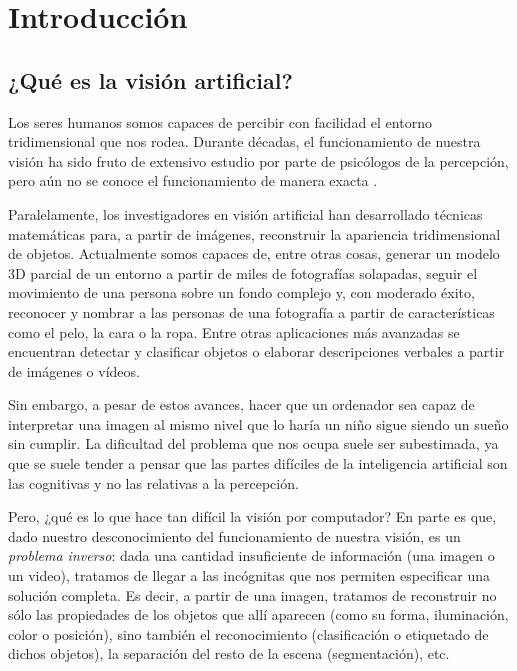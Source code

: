 \section{Introducción}
\subsection{¿Qué es la visión artificial?}

Los seres humanos somos capaces de percibir con facilidad el entorno tridimensional que nos rodea. Durante décadas, el funcionamiento de nuestra visión ha sido fruto de extensivo estudio por parte de psicólogos de la percepción, pero aún no se conoce el funcionamiento de manera exacta  \cite{book:szeliski}.

Paralelamente, los investigadores en visión artificial han desarrollado técnicas matemáticas para, a partir de imágenes, reconstruir la apariencia tridimensional de objetos. Actualmente somos capaces de, entre otras cosas, generar un modelo 3D parcial de un entorno a partir de miles de fotografías solapadas, seguir el movimiento de una persona sobre un fondo complejo y, con moderado éxito, reconocer y nombrar a las personas de una fotografía a partir de características como el pelo, la cara o la ropa. Entre otras aplicaciones más avanzadas se encuentran detectar y clasificar objetos o elaborar descripciones verbales a partir de imágenes o vídeos.

Sin embargo, a pesar de estos avances, hacer que un ordenador sea capaz de interpretar una imagen al mismo nivel que lo haría un niño sigue siendo un sueño sin cumplir. La dificultad del problema que nos ocupa suele ser subestimada, ya que se suele tender a pensar que las partes difíciles de la inteligencia artificial son las cognitivas y no las relativas a la percepción.

Pero, ¿qué es lo que hace tan difícil la visión por computador? En parte es que, dado nuestro desconocimiento del funcionamiento de nuestra visión, es un \textit{problema inverso}: dada una cantidad insuficiente de información (una imagen o un video), tratamos de llegar a las incógnitas que nos permiten especificar una solución completa. Es decir, a partir de una imagen, tratamos de reconstruir no sólo las propiedades de los objetos que allí aparecen (como su forma, iluminación, color o posición), sino también el reconocimiento (clasificación o etiquetado de dichos objetos), la separación del resto de la escena (segmentación), etc.

